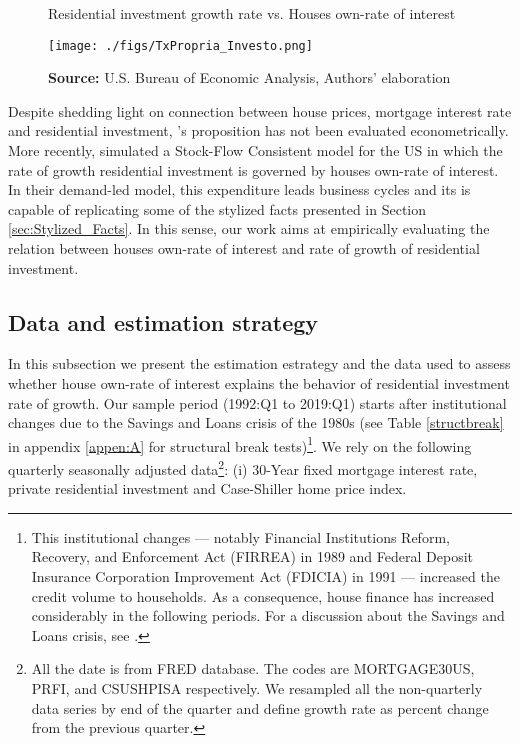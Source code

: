 \documentclass[12pt, a4paper]{article}
\begin{document}
\begin{figure}[htb]
	\centering
	\caption{Residential investment growth rate vs. Houses own-rate of interest}
	\label{propria_investo}
	\texttt{[image: ./figs/TxPropria\_Investo.png]}
	\caption*{\textbf{Source:} U.S. Bureau of Economic Analysis, Authors' elaboration}
\end{figure}

Despite shedding light on connection between house prices, mortgage interest rate and residential investment, \citeauthor*{teixeira_crescimento_2015}'s \citeyear{teixeira_crescimento_2015} proposition has not been evaluated econometrically.
More recently, \textcite{petrini_2021_TD} simulated a Stock-Flow Consistent model for the US in which the rate of growth residential investment is governed by houses own-rate of interest.
In their demand-led model, this expenditure leads business cycles and its is capable of replicating some of the stylized facts presented in Section \ref{sec:Stylized_Facts}.
In this sense, our work aims at empirically evaluating the relation between houses own-rate of interest and rate of growth of residential investment.


\subsection{Data and estimation strategy}
\label{sec:org4bacaf1}
\label{sec:estimation}

In this subsection we present the estimation estrategy and the data used to assess whether house own-rate of interest explains the behavior of residential investment rate of growth.
Our sample period (1992:Q1 to 2019:Q1) starts after institutional changes due to the Savings and Loans crisis of the 1980s (see Table \ref{structbreak} in appendix \ref{appen:A} for structural break tests)\footnote{This institutional changes --- notably Financial Institutions Reform, Recovery, and Enforcement Act (FIRREA) in 1989 and Federal Deposit Insurance Corporation Improvement Act  (FDICIA) in 1991 --- increased the credit volume to households. As a consequence, house finance has increased considerably in the following periods. For a discussion about the Savings and Loans crisis, see \textcite{federal_deposit_insurance_corporation_savings_1997}.}.
We rely on the following  quarterly seasonally adjusted data\footnote{All the date is from FRED database. The codes are MORTGAGE30US, PRFI, and CSUSHPISA respectively. We resampled all the non-quarterly data series by end of the quarter and define growth rate as percent change from the previous quarter.}: (i) 30-Year fixed mortgage interest rate, private residential investment and Case-Shiller home price index.
\end{document}
